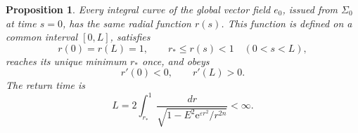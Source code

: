 \documentclass[11pt,a4paper]{article}
\numberwithin{equation}{section}
\newtheorem{proposition}[theorem]{Proposition}
\newcommand{\ee}{\mathrm e}
\begin{document}
\begin{proposition}\label{prop:radial-behavior}
Every integral curve of the global vector field $e_0$, issued from $\Sigma_0$ at time $s=0$, has the same radial function $r(s)$.  This function is defined on a common interval $[0,L]$, satisfies
\begin{equation}\label{eq:r-global-behavior}
        r(0)=r(L)=1,
        \qquad
        r_*\le r(s)<1\quad(0<s<L),
\end{equation}
reaches its unique minimum $r_*$ once, and obeys
\begin{equation}
        r'(0)<0,
        \qquad
        r'(L)>0.
\end{equation}
The return time is
\begin{equation}\label{eq:L-integral}
        L
        =2\int_{r_*}^{1}
        \frac{dr}{\sqrt{1-E^2\ee^{\varepsilon r^2}/r^{2n}}}<\infty.
\end{equation}
\end{proposition}
\end{document}
